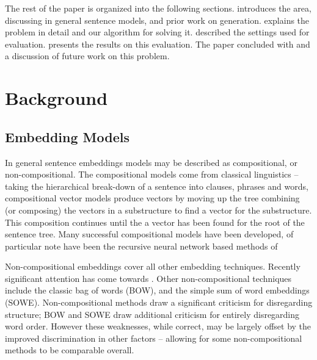 \documentclass[11pt]{article}
\theoremstyle{plain}
\theoremstyle{definition}
\begin{document}
The rest of the paper is organized into the following sections.  introduces the area, discussing in general sentence models, and prior work on generation.  explains the problem in detail and our algorithm for solving it.  described the settings used for evaluation.  presents the results on this evaluation. The paper concluded with  and a discussion of future work on this problem.


\section{Background}\label{relwork}

\subsection{Embedding Models}
In general sentence embeddings models may be described as compositional, or non-compositional.
The compositional models come from classical linguistics -- taking the hierarchical  break-down of a sentence into clauses, phrases and words, compositional vector models produce vectors by moving up the tree combining (or composing) the vectors in a substructure to find a vector for the substructure. This composition continues until the a vector has been found for the root of the sentence tree. Many successful compositional models have been developed, of particular note have been the recursive neural network based methods of  \textcite{socher2010PhraseEmbedding}%

Non-compositional embeddings cover all other embedding techniques. Recently significant attention has come towards  \textcite{le2014distributed}. Other non-compositional techniques include the classic bag of words (BOW), and the simple sum of word embeddings (SOWE). Non-compositional methods draw a significant criticism for disregarding structure; BOW and SOWE draw additional criticism for entirely disregarding word order. However these weaknesses, while correct, may be largely offset by the improved discrimination in other factors -- allowing for some non-compositional methods to be comparable overall. 
\end{document}
